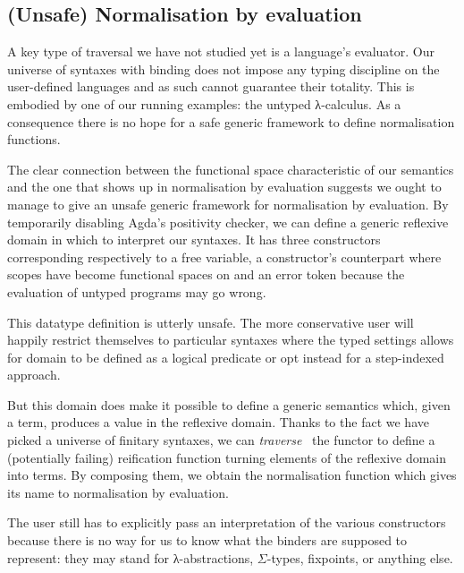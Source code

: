 \subsection{(Unsafe) Normalisation by evaluation}\label{section:nbyeval}

A key type of traversal we have not studied yet is a language's
evaluator. Our universe of syntaxes with binding does not impose
any typing discipline on the user-defined languages and as such
cannot guarantee their totality. This is embodied by one of our running
examples: the untyped λ-calculus. As a consequence there
is no hope for a safe generic framework to define normalisation
functions.

The clear connection between the  functional space
characteristic of our semantics and the one that shows up in
normalisation by evaluation suggests we ought to manage to
give an unsafe generic framework for normalisation by evaluation.
By temporarily disabling Agda's positivity checker,
we can define a generic reflexive domain  in which to
interpret our syntaxes. It has three constructors corresponding
respectively to a free variable, a constructor's counterpart where
scopes have become  functional spaces on  and
an error token because the evaluation of untyped programs may go wrong.

\begin{agdasnippet}
\end{agdasnippet}

This datatype definition is utterly unsafe. The more conservative
user will happily restrict themselves to particular syntaxes where
the typed settings allows for domain to be defined as a logical
predicate or opt instead for a step-indexed approach.

But this domain does make it possible to define a generic 
semantics which, given a term, produces a value in the reflexive
domain. Thanks to the fact we have picked a universe of finitary syntaxes, we
can \emph{traverse}~\cite{mcbride_paterson_2008,DBLP:journals/jfp/GibbonsO09}
the functor to define
a (potentially failing) reification function turning elements of the
reflexive domain into terms. By composing them, we obtain the
normalisation function which gives its name to normalisation by
evaluation.

The user still has to explicitly pass an interpretation of
the various constructors because there is no way for us to
know what the binders are supposed to represent: they may
stand for λ-abstractions, $\Sigma$-types, fixpoints, or
anything else.

